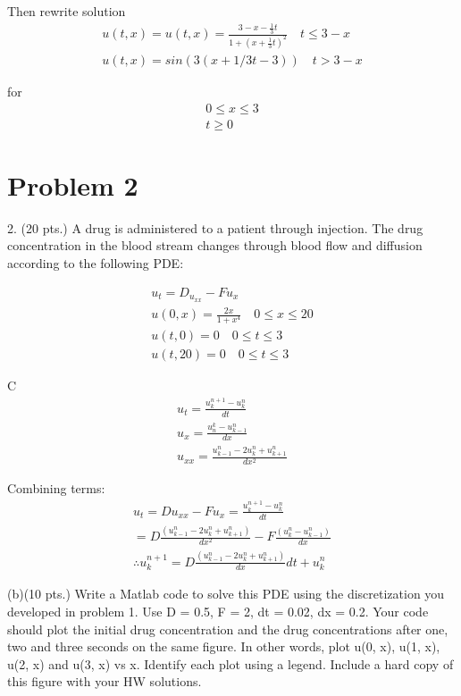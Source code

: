 \documentclass{article}
\begin{document}
Then rewrite solution
\begin{align*}
u(t,x) = u(t,x)= \frac{3 - x - \frac{1}{3}t}{1+(x+\frac{1}{3}t)^2} \quad t \leq 3 - x \\
u(t,x) = sin(3(x + 1/3t - 3)) \quad t > 3 - x
\end{align*}

for
\begin{align*}
0 \leq x \leq 3 \\
t \geq 0
\end{align*}

\noindent

\section*{Problem 2}
2. (20 pts.) A drug is administered to a patient through injection. The drug concentration in the
blood stream changes through blood flow and diffusion according to the following PDE:

\begin{align*}
u_{t} = D_{u_{xx}} - Fu_{x} \\
u(0,x) = \frac{2x}{1+x^{4}} \quad 0 \leq x \leq 20 \\
u(t,0) = 0 \quad 0 \leq t \leq 3 \\
u(t,20) = 0 \quad 0 \leq t \leq 3
\end{align*}

C
\begin{align*}
u_{t} = \frac{ u_{k}^{n+1} - u^{n}_{k} }{dt} \\
u_{x} = \frac{u_{n}^{k} - u^{n}_{k-1}}{dx} \\
u_{xx} = \frac{u^{n}_{k-1} - 2u^{n}_{k} + u^{n}_{k+1}}{dx^{2}}
\end{align*}

Combining terms:
\begin{align*}
u_{t} = Du_{xx} - Fu_{x} = \frac{u^{n+1}_{k} - u^{n}_{k}}{dt}\\
= D\frac{ ( u^{n}_{k-1} - 2u^{n}_{k} + u^{n}_{k+1} )}{dx^{2}} - F\frac{(u^{n}_{k} - u^{n}_{k-1})}{dx} \\
\therefore u_{k}^{n+1} = D\frac{(u^{n}_{k-1} - 2u^{n}_{k} + u^{n}_{k+1})}{dx}dt + u^{n}_{k}
\end{align*}

(b)(10 pts.) Write a Matlab code to solve this PDE using the discretization you developed in problem 1. Use D = 0.5, F = 2, dt = 0.02, dx = 0.2. Your code should plot the initial drug concentration and the drug concentrations after one, two and three seconds on the same figure. In other words, plot u(0, x), u(1, x), u(2, x) and u(3, x) vs x. Identify each plot using a legend. Include a hard copy of this figure with your HW solutions.
\end{document}
